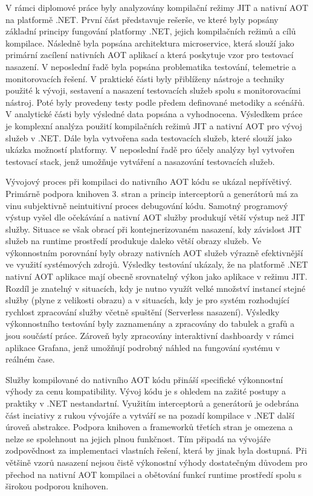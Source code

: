 
V rámci diplomové práce byly analyzovány kompilační režimy JIT a nativní AOT na platformě .NET. První část představuje rešerše, ve které byly popsány základní principy fungování platformy .NET, jejich kompilačních režimů a cílů kompilace. Následně byla popsána architektura microservice, která slouží jako primární zacílení nativních AOT aplikací a která poskytuje vzor pro testovací nasazení. V neposlední řadě byla popsána problematika testování, telemetrie a monitorovacích řešení. V praktické části byly přiblíženy nástroje a techniky použité k vývoji, sestavení a nasazení testovacích služeb spolu s monitorovacími nástroj. Poté byly provedeny testy podle předem definované metodiky a scénářů. V analytické části byly výsledné data popsána a vyhodnocena. Výsledkem práce je komplexní analýza použití kompilačních režimů JIT a nativní AOT pro vývoj služeb v .NET. Dále byla vytvořena sada testovacích služeb, které slouží jako ukázka možností platformy. V neposlední řadě pro účely analýzy byl vytvořen testovací stack, jenž umožňuje vytváření a nasazování testovacích služeb. 

Vývojový proces při kompilaci do nativního AOT kódu se ukázal nepřívětivý. Primárně podpora knihoven 3. stran a princip interceptorů a generátorů má za vinu subjektivně neintuitivní proces debugování kódu. Samotný programový výstup vyšel dle očekávání a nativní AOT služby produkují větší výstup než JIT služby. Situace se však obrací při kontejnerizovaném nasazení, kdy závislost JIT služeb na runtime prostředí produkuje daleko větší obrazy služeb. Ve výkonnostním porovnání byly obrazy nativních AOT služeb výrazně efektivnější ve využití systémových zdrojů. Výsledky testování ukázaly, že na platformě .NET nativní AOT aplikace mají obecně srovnatelný výkon jako aplikace v režimu JIT. Rozdíl je znatelný v situacích, kdy je nutno využít velké množství instancí stejné služby (plyne z velikosti obrazu) a v situacích, kdy je pro systém rozhodující rychlost zpracování služby včetně spuštění (Serverless nasazení). Výsledky výkonnostního testování byly zaznamenány a zpracovány do tabulek a grafů a jsou součástí práce. Zároveň byly zpracovány interaktivní dashboardy v rámci aplikace Grafana, jenž umožňují podrobný náhled na fungování systému v reálném čase.

Služby kompilované do nativního AOT kódu přináší specifické výkonnostní výhody za cenu kompatibility. Vývoj kódu je s ohledem na zažité postupy a praktiky v .NET nestandartní. Využitím interceptorů a generátorů je odebrána část inciativy z rukou vývojáře a vytváří se na pozadí kompilace v .NET další úroveň abstrakce. Podpora knihoven a frameworků třetích stran je omezena a nelze se spolehnout na jejich plnou funkčnost. Tím připadá na vývojáře zodpovědnost za implementaci vlastních řešení, která by jinak byla dostupná. Při většině vzorů nasazení nejsou čistě výkonostní výhody dostatečným důvodem pro přechod na nativní AOT kompilaci a obětování funkcí runtime prostředí spolu s širokou podporou knihoven.

